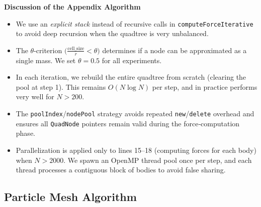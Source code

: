\documentclass{article}
\begin{document}
\textbf{Discussion of the Appendix Algorithm}

\begin{itemize}
  \item We use an \emph{explicit stack} instead of recursive calls in \texttt{computeForceIterative} to avoid deep recursion when the quadtree is very unbalanced.
  \item The \(\theta\)-criterion \(\bigl(\frac{\text{cell\_size}}{r} < \theta\bigr)\) determines if a node can be approximated as a single mass.  We set \(\theta = 0.5\) for all experiments.
  \item In each iteration, we rebuild the entire quadtree from scratch (clearing the pool at step 1).  This remains \(O(N\log N)\) per step, and in practice performs very well for \(N > 200\).
  \item The \texttt{poolIndex}/\texttt{nodePool} strategy avoids repeated \texttt{new}/\texttt{delete} overhead and ensures all \texttt{QuadNode} pointers remain valid during the force‐computation phase.
  \item Parallelization is applied only to lines 15–18 (computing forces for each body) when \(N > 2000\).  We spawn an OpenMP thread pool once per step, and each thread processes a contiguous block of bodies to avoid false sharing.
\end{itemize}


\subsection{Particle Mesh Algorithm}
\end{document}
